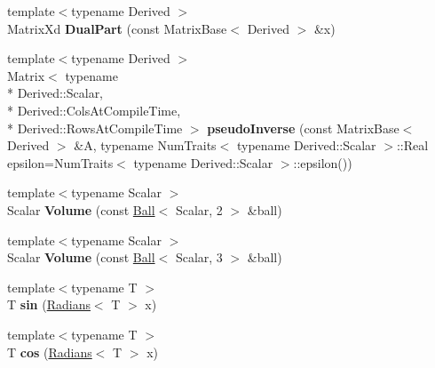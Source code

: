 \begin{DoxyCompactItemize}
\item 
\hypertarget{namespace_d_r_d_s_p_a293161a052cb516e81d0285d726c1bf8}{{\footnotesize template$<$typename Derived $>$ }\\Matrix\-Xd {\bfseries Dual\-Part} (const Matrix\-Base$<$ Derived $>$ \&x)}\label{namespace_d_r_d_s_p_a293161a052cb516e81d0285d726c1bf8}

\item 
\hypertarget{namespace_d_r_d_s_p_a382b480192fb2dc8c95cde39a64e7734}{{\footnotesize template$<$typename Derived $>$ }\\Matrix$<$ typename \\*
Derived\-::\-Scalar, \\*
Derived\-::\-Cols\-At\-Compile\-Time, \\*
Derived\-::\-Rows\-At\-Compile\-Time $>$ {\bfseries pseudo\-Inverse} (const Matrix\-Base$<$ Derived $>$ \&A, typename Num\-Traits$<$ typename Derived\-::\-Scalar $>$\-::Real epsilon=Num\-Traits$<$ typename Derived\-::\-Scalar $>$\-::epsilon())}\label{namespace_d_r_d_s_p_a382b480192fb2dc8c95cde39a64e7734}

\item 
\hypertarget{namespace_d_r_d_s_p_ac641b0bfae8c2be9d3f0573c15fb1a4b}{{\footnotesize template$<$typename Scalar $>$ }\\Scalar {\bfseries Volume} (const \hyperlink{struct_d_r_d_s_p_1_1_ball}{Ball}$<$ Scalar, 2 $>$ \&ball)}\label{namespace_d_r_d_s_p_ac641b0bfae8c2be9d3f0573c15fb1a4b}

\item 
\hypertarget{namespace_d_r_d_s_p_a65f0f6c65a16277e343a1f7444caf03b}{{\footnotesize template$<$typename Scalar $>$ }\\Scalar {\bfseries Volume} (const \hyperlink{struct_d_r_d_s_p_1_1_ball}{Ball}$<$ Scalar, 3 $>$ \&ball)}\label{namespace_d_r_d_s_p_a65f0f6c65a16277e343a1f7444caf03b}

\item 
\hypertarget{namespace_d_r_d_s_p_a69381ef92f19ad7e7597a0a37f6bc2f9}{{\footnotesize template$<$typename T $>$ }\\T {\bfseries sin} (\hyperlink{struct_d_r_d_s_p_1_1_radians}{Radians}$<$ T $>$ x)}\label{namespace_d_r_d_s_p_a69381ef92f19ad7e7597a0a37f6bc2f9}

\item 
\hypertarget{namespace_d_r_d_s_p_a9630e9f106d4a87cad11312c40d94dcc}{{\footnotesize template$<$typename T $>$ }\\T {\bfseries cos} (\hyperlink{struct_d_r_d_s_p_1_1_radians}{Radians}$<$ T $>$ x)}\label{namespace_d_r_d_s_p_a9630e9f106d4a87cad11312c40d94dcc}


\end{DoxyCompactItemize}
